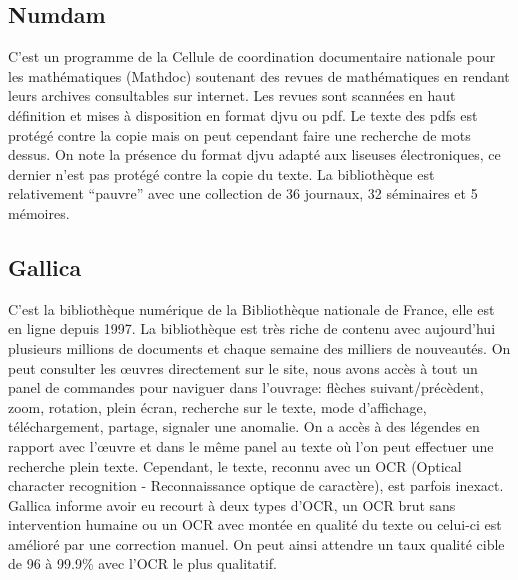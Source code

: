         \subsection{Numdam}
        \label{subsec:numdam}
        C’est un programme de la Cellule de coordination documentaire nationale pour les mathématiques (Mathdoc) soutenant des revues
        de mathématiques en rendant leurs archives consultables sur internet. Les revues sont scannées en haut définition et mises
        à disposition en format djvu ou pdf. Le texte des pdfs est protégé contre la copie mais on peut cependant faire
        une recherche de mots dessus. On note la présence du format djvu adapté aux liseuses électroniques, ce dernier n’est
        pas protégé contre la copie du texte. La bibliothèque est relativement “pauvre” avec une collection de 36 journaux, 32 séminaires et 5 mémoires.

        \subsection{Gallica}
        \label{subsec:gallica}
        C’est la bibliothèque numérique de la Bibliothèque nationale de France, elle est en ligne depuis 1997.
        La bibliothèque est très riche de contenu avec aujourd’hui plusieurs millions de documents
        et chaque semaine des milliers de nouveautés. On peut consulter les œuvres directement sur le site,
        nous avons accès à tout un panel de commandes pour naviguer dans l’ouvrage: flèches suivant/précèdent,
        zoom, rotation, plein écran, recherche sur le texte, mode d’affichage, téléchargement, partage,
        signaler une anomalie. On a accès à des légendes en rapport avec l’œuvre et dans le même panel
        au texte où l’on peut effectuer une recherche plein texte. Cependant, le texte, reconnu avec un OCR
        (Optical character recognition - Reconnaissance optique de caractère), est parfois inexact.
        Gallica informe avoir eu recourt à deux types d’OCR, un OCR brut sans intervention humaine ou un OCR
        avec montée en qualité du texte ou celui-ci est amélioré par une correction manuel. On peut ainsi
        attendre un taux qualité cible de 96 à 99.9\% avec l’OCR le plus qualitatif.

